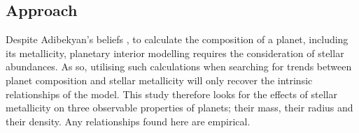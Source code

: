 \documentclass[a4paper,twocolumn,12pt]{article}
\begin{document}



\subsection{Approach}
\label{subsection: Approach}
Despite Adibekyan's beliefs \cite{Adibekyan}, to calculate the composition of a planet, including its metallicity, planetary interior modelling requires the consideration of stellar abundances. As so, utilising such calculations when searching for trends between planet composition and stellar metallicity will only recover the intrinsic relationships of the model. This study therefore looks for the effects of stellar metallicity on three observable properties of planets; their mass, their radius and their density. Any relationships found here are empirical.
\end{document}
